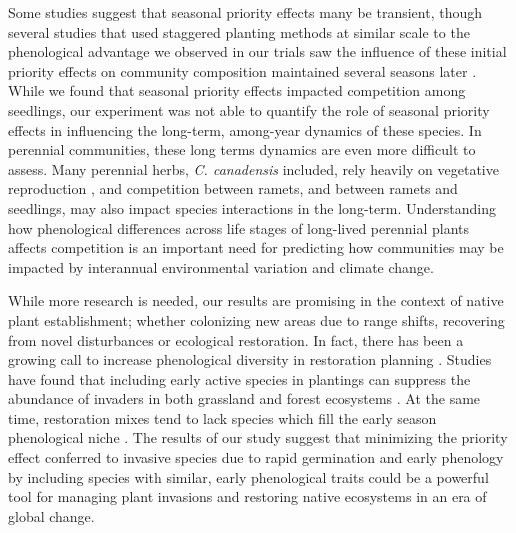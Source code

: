 \documentclass{article}[11pt]
\begin{document}
%
Some studies suggest that seasonal priority effects many be transient, though several studies that used staggered planting methods at similar scale to the phenological advantage we observed in our trials saw the influence of these initial priority effects on community composition maintained several seasons later \citep{Vaughn:2015wp,Young:2017aa,Torrez:2017to}. While we found that seasonal priority effects impacted competition among seedlings, our experiment was not able to quantify the role of seasonal priority effects in influencing the long-term, among-year dynamics of these species. %
 In perennial communities, these long terms dynamics are even more difficult to assess. Many perennial herbs, \textit{C. canadensis} included, rely heavily on vegetative reproduction \citep{Hawkins:2005ve}, and competition between ramets, and between ramets and seedlings, may also impact species interactions in the long-term. %
Understanding how phenological differences across life stages of long-lived perennial plants affects competition is an important need for predicting how communities may be impacted by interannual environmental variation and climate change.  

While more research is needed, our results are promising in the context of native plant establishment; whether colonizing new areas due to range shifts, recovering from novel disturbances or ecological restoration. In fact, there has been a growing call to increase phenological diversity in restoration planning \citep{Hess:2019vn}. Studies have found that including early active species in plantings can suppress the abundance of invaders in both grassland \citep{Cleland:2013wo} and forest ecosystems \citep{Schuster:2020ww}. At the same time, restoration mixes tend to lack species which fill the early season phenological niche \citep{Havens:2016vo}. The results of our study suggest that minimizing the priority effect conferred to invasive species due to rapid germination and early phenology by including species with similar, early phenological traits could be a powerful tool for managing plant invasions and restoring native ecosystems in an era of global change.
\end{document}
